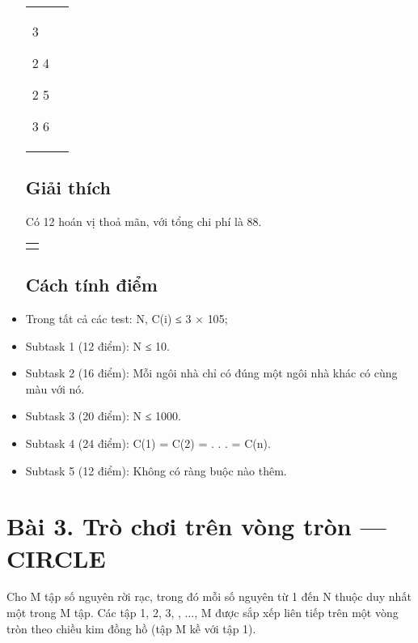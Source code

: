 \begin{itemize}
\begin{longtable}[]{@{}
    >{\raggedright\arraybackslash}p{}
    >{\raggedright\arraybackslash}p{}@{}}
  1 3

  2 4

  2 5

  3 6 & 333333343 \\
  \end{longtable}

  \subsection{Giải thích}\label{giux1ea3i-thuxedch-1}

  Có 12 hoán vị thoả mãn, với tổng chi phí là 88.

  {}

  \begin{longtable}[]{@{}l@{}}
  \toprule\noalign{}
  \endhead
  \bottomrule\noalign{}
  \endlastfoot
   \\
  \end{longtable}

  \hfill\break

  \subsection{Cách tính điểm}\label{cuxe1ch-tuxednh-ux111iux1ec3m-1}

  \hfill\break
\item
  {Trong tất cả các test: }{N, C}({i}) {≤ }3 {× }10{5}{;}
\item
  Subtask 1 (12 điểm): {N }{≤ }{10}.
\item
  Subtask 2 (16 điểm): Mỗi ngôi nhà chỉ có đúng một ngôi nhà khác có
  cùng màu với nó.
\item
  Subtask 3 (20 điểm): {N }{≤ }{1000}.
\item
  {Subtask 4 (24 điểm): }C{(1) = }C{(2) = }. . . {= }C{(}n{)}{.}
\item
  Subtask 5 (12 điểm): Không có ràng buộc nào thêm.
\end{itemize}

\section{Bài 3. Trò chơi trên vòng tròn ---
CIRCLE}\label{buxe0i-3.-truxf2-chux1a1i-truxean-vuxf2ng-truxf2n-circle}

\hfill\break

Cho {M }tập số nguyên rời rạc, trong đó mỗi số nguyên từ {1 }đến {N
}thuộc duy nhất một trong {M }tập. Các tập {1}{, }{2}{, }{3}{, , ..., M
}được sắp xếp liên tiếp trên một vòng tròn theo chiều kim đồng hồ (tập
{M }kề với tập {1}).

